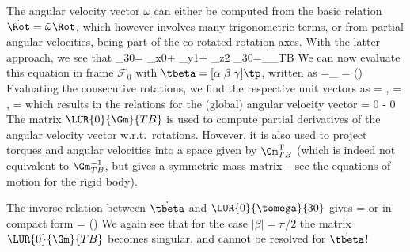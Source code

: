 The angular velocity vector $\omega$ can either be computed from the basic relation $\dot \Rot = \tilde \omega \Rot$, which however involves many trigonometric terms, or from partial angular velocities, being part of the co-rotated rotation axes.
With the latter approach, we see that
\be
  \tomega_{30}=\dot{\alpha} \ev_{x0}+\dot{\beta} \ev_{y1}+\dot{\gamma} \ev_{z2} \quad {} \quad 
  \tomega_{30}=_{\Gm_{TB}} \vr{\dot{\alpha}}{\dot{\beta}}{\dot{\gamma}}
\ee
We can now evaluate this equation in frame $\mathcal{F}_0$ with $\tbeta=[\alpha\;\beta\;\gamma]\tp$, written as
\be 
  =_{} \vr{\dot{\alpha}}{\dot{\beta}}{\dot{\gamma}} = 
  (\tbeta) \dot{\tbeta} \eqDot
\ee
Evaluating the consecutive rotations, we find the respective unit vectors as
\be
   = , \quad
   = , \quad {} \quad
   =  \eqDot
\ee
which results in the relations for the (global) angular velocity vector
\be \label{eq:theory:rotations:TaitBryanG}
   = 
   { \beta}
  {0}{ \alpha} {- \alpha {} \beta}
  {0}{ \alpha} { \alpha {} \beta}  
  \vr{\dot{\alpha}}{\dot{\beta}}{\dot{\gamma}} 
\ee
The matrix $\LUR{0}{\Gm}{TB}$ is used to compute partial derivatives of the angular velocity vector w.r.t.\ rotations.
However, it is also used to project torques and angular velocities into a space given by $\Gm_{TB}^\mathrm{T}$ (which is indeed not equivalent to $\Gm_{TB}^{-1}$, but gives a symmetric mass matrix -- see the equations of motion for the rigid body).

The inverse relation between $\dot \tbeta$ and $\LUR{0}{\tomega}{30}$ gives
\be \label{eq:theory:rotations:TaitBryanGinv}
  \vr{\dot{\alpha}}{\dot{\beta}}{\dot{\gamma}} =    
\ee
or in compact form
\be
  \dot{\tbeta} = (\tbeta)  
\ee
We again see that for the case $\vert \beta \vert = \pi/2$ the matrix$\LUR{0}{\Gm}{TB}$ becomes singular, and  cannot be resolved for $\dot{\tbeta}$!

